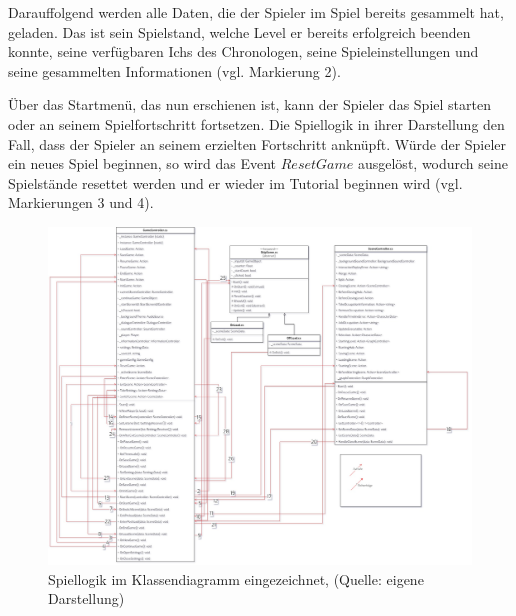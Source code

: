 Darauffolgend werden alle Daten, die der Spieler im Spiel bereits gesammelt hat, geladen. Das ist sein Spielstand, welche Level er bereits erfolgreich beenden konnte, seine verfügbaren Ichs des Chronologen, seine Spieleinstellungen und seine gesammelten Informationen (vgl. Markierung 2). 

Über das Startmenü, das nun erschienen ist, kann der Spieler das Spiel starten oder an seinem Spielfortschritt fortsetzen. Die Spiellogik in ihrer Darstellung den Fall, dass der Spieler an seinem erzielten Fortschritt anknüpft. Würde der Spieler ein neues Spiel beginnen, so wird das Event $ResetGame$ ausgelöst, wodurch seine Spielstände resettet werden und er wieder im Tutorial beginnen wird (vgl. Markierungen 3 und 4).

\begin{figure}[ht]
\centering
\includegraphics[width=1\linewidth]{content/pictures/Game-Loop-Class-Diagramm-Connectors.jpg}
\caption{Spiellogik im Klassendiagramm eingezeichnet, (Quelle: eigene Darstellung)}
\label{fig:main_game_loop_class_connectors}
\end{figure}

